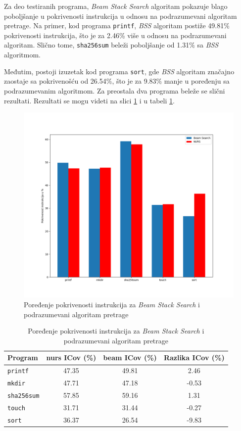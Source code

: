 \documentclass[a4paper]{article}
\begin{document}
Za deo testiranih programa, \textit{Beam Stack Search} algoritam pokazuje blago poboljšanje u pokrivenosti instrukcija u odnosu na podrazumevani algoritam pretrage. Na primer, kod programa \verb|printf|, \textit{BSS} algoritam postiže 49.81\% pokrivenosti instrukcija, što je za 2.46\% više u odnosu na podrazumevani algoritam. Slično tome, \verb|sha256sum| beleži poboljšanje od 1.31\% sa \textit{BSS} algoritmom.

Međutim, postoji izuzetak kod programa \verb|sort|, gde \textit{BSS} algoritam značajno zaostaje sa pokrivenošću od 26.54\%, što je za 9.83\% manje u poređenju sa podrazumevanim algoritmom. Za preostala dva programa beleže se slični rezultati. Rezultati se mogu videti na slici \ref{fig:icov_comparison} i u tabeli \ref{tab:icov_comparison}.

\begin{figure}[h!]
    \centering
    \includegraphics[width=\linewidth]{ilustracije/ICov.png}
    \caption{Poređenje pokrivenosti instrukcija za \textit{Beam Stack Search} i podrazumevani algoritam pretrage}
    \label{fig:icov_comparison}
\end{figure}

\begin{table}[h!]
\centering
\begin{tabular}{|l|c|c|c|}
\hline
\textbf{Program} & \textbf{nurs ICov (\%)} & \textbf{beam ICov (\%)} & \textbf{Razlika ICov (\%)} \\ \hline
\texttt{printf} & 47.35 & 49.81 & 2.46 \\ \hline
\texttt{mkdir} & 47.71 & 47.18 & -0.53 \\ \hline
\texttt{sha256sum} & 57.85 & 59.16 & 1.31 \\ \hline
\texttt{touch} & 31.71 & 31.44 & -0.27 \\ \hline
\texttt{sort} & 36.37 & 26.54 & -9.83 \\ \hline
\end{tabular}
\caption{Poređenje pokrivenosti instrukcija za \textit{Beam Stack Search} i podrazumevani algoritam pretrage}
\label{tab:icov_comparison}
\end{table}
\end{document}
